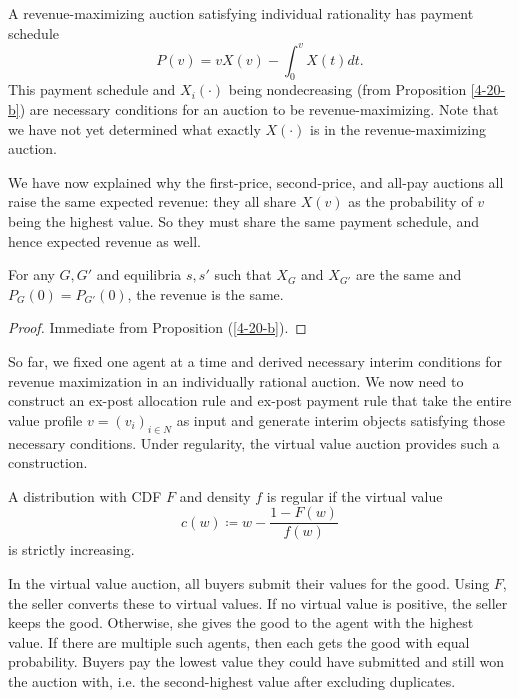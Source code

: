 \begin{corollary} \label{4-20-c}
	A revenue-maximizing auction satisfying individual rationality has payment schedule \[
		P(v) = vX(v) - \int_{0}^{v} X(t)dt 
	.\] 
	This payment schedule and $X_i(\cdot)$ being nondecreasing (from Proposition \ref{4-20-b}) are necessary conditions for an auction to be revenue-maximizing.
	Note that we have not yet determined what exactly $X(\cdot)$ is in the revenue-maximizing auction.
\end{corollary}

We have now explained why the first-price, second-price, and all-pay auctions all raise the same expected revenue: they all share $X(v)$ as the probability of $v$ being the highest value. So they must share the same payment schedule, and hence expected revenue as well.

\begin{proposition}
	For any $G,G'$ and equilibria $s,s'$ such that $X_G$ and $X_{G'}$ are the same and $P_G(0)=P_{G'}(0)$, the revenue is the same.
\end{proposition}
\begin{proof}
	Immediate from Proposition (\ref{4-20-b}).
\end{proof}

So far, we fixed one agent at a time and derived necessary interim conditions for revenue maximization in an individually rational auction.
We now need to construct an ex-post allocation rule and ex-post payment rule that take the entire value profile $v=\left( v_i \right)_{i \in N}$ as input and generate interim objects satisfying those necessary conditions. Under regularity, the virtual value auction provides such a construction.

\begin{definition}
	A distribution with CDF $F$ and density $f$ is regular if the virtual value \[
		c(w) \coloneqq w - \frac{1-F(w)}{f(w)}
	\] is strictly increasing.
\end{definition}

\begin{definition} \label{4-22-4}
	In the virtual value auction, all buyers submit their values for the good. Using $F$, the seller converts these to virtual values. If no virtual value is positive, the seller keeps the good. Otherwise, she gives the good to the agent with the highest value. If there are multiple such agents, then each gets the good with equal probability. Buyers pay the lowest value they could have submitted and still won the auction with, i.e. the second-highest value after excluding duplicates.
\end{definition}

